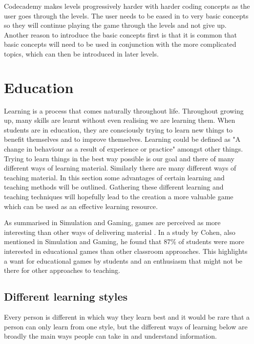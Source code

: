 \documentclass[a4paper]{article}
\begin{document}
Codecademy makes levels progressively harder with harder coding concepts as the user goes through the levels. The user needs to be eased in to very basic concepts so they will continue playing the game through the levels and not give up. Another reason to introduce the basic concepts first is that it is common that basic concepts will need to be used in conjunction with the more complicated topics, which can then be introduced in later levels.

\section{Education}

Learning is a process that comes naturally throughout life. Throughout growing up, many skills are learnt without even realising we are learning them. When students are in education, they are consciously trying to learn new things to benefit themselves and to improve themselves. Learning could be defined as "A change in behaviour as a result of experience or practice" amongst other things. \cite{pritchard2013ways} Trying to learn things in the best way possible is our goal and there of many different ways of learning material. Similarly there are many different ways of teaching material. In this section some advantages of certain learning and teaching methods will be outlined. Gathering these different learning and teaching techniques will hopefully lead to the creation a more valuable game which can be used as an effective learning resource.

As summarised in Simulation and Gaming, games are perceived as more interesting than other ways of delivering material \cite{garris2002games}. In a study by Cohen, also mentioned in Simulation and Gaming, he found that 87\% of students were more interested in educational games than other classroom approaches. This highlights a want for educational games by students and an enthusiasm that might not be there for other approaches to teaching.

\subsection{Different learning styles}

Every person is different in which way they learn best and it would be rare that a person can only learn from one style, but the different ways of learning below are broadly the main ways people can take in and understand information.
\end{document}
